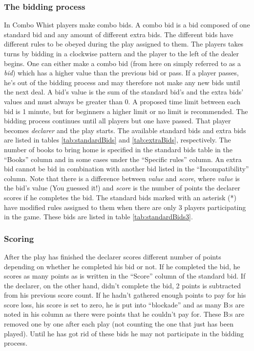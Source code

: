 \documentclass[a4paper, 11pt]{article}
\begin{document}
			\subsubsection{The bidding process}
			In Combo Whist players make combo bids. A combo bid is a bid composed of one standard bid and any amount of different extra bids. The different bids have different rules to be obeyed during the play assigned to them. The players takes turns by bidding in a clockwise pattern and the player to the left of the dealer begins. One can either make a combo bid (from here on simply referred to as a \emph{bid}) which has a higher value than the previous bid or pass. If a player passes, he's out of the bidding process and may therefore not make any new bids until the next deal. A bid's value is the sum of the standard bid's and the extra bids' values and must always be greater than 0. A proposed time limit between each bid is 1 minute, but for beginners a higher limit or no limit is recommended. The bidding process continues until all players but one have passed. That player becomes \emph{declarer} and the play starts. The available standard bids and extra bids are listed in tables \ref{tab:standardBids} and \ref{tab:extraBids}, respectively. The number of books to bring home is specified in the standard bids table in the ``Books'' column and in some cases under the ``Specific rules'' column. An extra bid cannot be bid in combination with another bid listed in the ``Incompatibility'' column. Note that there is a difference between \emph{value} and \emph{score}, where \emph{value} is the bid's value (You guessed it!) and \emph{score} is the number of points the declarer scores if he completes the bid. The standard bids marked with an asterisk (*) have modified rules assigned to them when there are only 3 players participating in the game. These bids are listed in table \ref{tab:standardBids3}.
			
			
			
			
			\subsubsection{Scoring}
			After the play has finished the declarer scores different number of points depending on whether he completed his bid or not. If he completed the bid, he scores as many points as is written in the ``Score'' column of the standard bid. If the declarer, on the other hand, didn't complete the bid, 2 points is subtracted from his previous score count. If he hadn't gathered enough points to pay for his score loss, his score is set to zero, he is put into ``blockade'' and as many B:s are noted in his column as there were points that he couldn't pay for. These B:s are removed one by one after each play (not counting the one that just has been played). Until he has got rid of these bids he may not participate in the bidding process.
			
\end{document}
